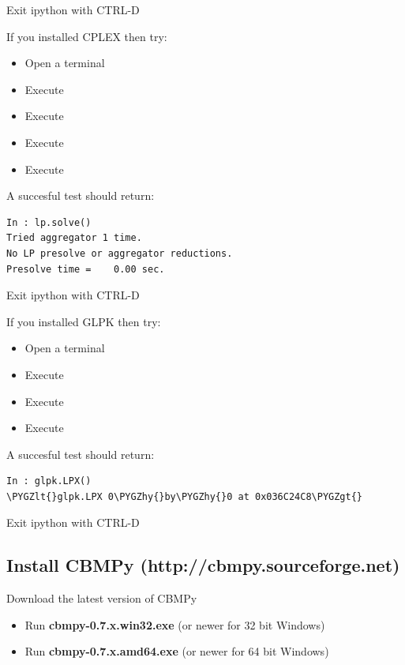 \documentclass[a4paper,11pt,english]{sphinxmanual}
\def\PYGZlt{\char`\<}
\def\PYGZgt{\char`\>}
\def\PYGZhy{\char`\-}
\begin{document}
Exit ipython with CTRL-D

If you installed CPLEX then try:
\begin{itemize}
\item {} 
Open a terminal

\item {} 
Execute 

\item {} 
Execute 

\item {} 
Execute 

\item {} 
Execute 

\end{itemize}

A succesful test should return:

\begin{Verbatim}[commandchars=\\\{\}]
In : lp.solve()
Tried aggregator 1 time.
No LP presolve or aggregator reductions.
Presolve time =    0.00 sec.
\end{Verbatim}

Exit ipython with CTRL-D

If you installed GLPK then try:
\begin{itemize}
\item {} 
Open a terminal

\item {} 
Execute 

\item {} 
Execute 

\item {} 
Execute 

\end{itemize}

A succesful test should return:

\begin{Verbatim}[commandchars=\\\{\}]
In : glpk.LPX()
\PYGZlt{}glpk.LPX 0\PYGZhy{}by\PYGZhy{}0 at 0x036C24C8\PYGZgt{}
\end{Verbatim}

Exit ipython with CTRL-D


\subsection{Install CBMPy (http://cbmpy.sourceforge.net)}
\label{install_doc:install-cbmpy-http-cbmpy-sourceforge-net}
Download the latest version of CBMPy
\begin{itemize}
\item {} 
Run \textbf{cbmpy-0.7.x.win32.exe} (or newer for 32 bit Windows)

\item {} 
Run \textbf{cbmpy-0.7.x.amd64.exe} (or newer for 64 bit Windows)

\end{itemize}
\end{document}
